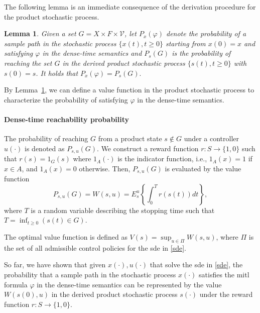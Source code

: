 \documentclass[letterpaper, 10 pt, conference]{ieeeconf}
\newtheorem{lemma}{Lemma}
\newcommand{\calV}{\mathcal{V}}
\begin{document}
The following lemma is an immediate consequence of the derivation
procedure for the product stochastic process.
\begin{lemma}
\label{lma:relate}
  Given a set $G= X\times F\times \calV$, let $P_{x}(\varphi )$ denote
  the probability of a sample path in the stochastic process
  $\{x(t),t\ge 0\}$ starting from $ x (0)=x$ and satisfying $\varphi$
  in the dense-time semantics and $P_{s}( G)$ is the probability of
  reaching the set $G$ in the derived product stochastic process
  $\{s(t), t\ge0 \}$ with $s(0)=s$. It holds that
  $P_{x}(\varphi )= P_{s}( G). $
\end{lemma}
By Lemma~\ref{lma:relate}, we can define a value function in the product
stochastic process to characterize the probability of satisfying
$\varphi$ in the dense-time semantics.
\paragraph*{\bf Dense-time reachability probability}
The probability of
reaching $G$ from a product state $s \notin G$ under a controller
$u(\cdot)$ is denoted as $P_{s, u}( G)$.
We construct a reward function $r: S \rightarrow \{1,0\}$ such
that $r(s)=1_G(s)$ where $1_A(\cdot)$ is the indicator function, i.e.,
$1_A(x)=1$ if $x\in A$, and $1_A(x)=0$ otherwise.
Then, $P_{s,u}( G)$ is evaluated by the value function
\[
P_{s,u}( G) = W(s, u)= E^u_{s}\left\{ \int_0^T r(s(t) )dt \right\},
\]
where $T$ is a random variable describing the stopping time such that
$T= \inf_{t\ge 0}(s(t) \in G)$.  





The optimal value function is defined as
$ V (s) = \sup_{u \in \Pi} W(s,u)$, where $\Pi$ is the set of all
admissible control policies for the \ac{sde} in \eqref{sde}.


So far, we have shown that given $x(\cdot), u(\cdot)$ that solve the
\ac{sde} in \eqref{sde}, the probability that a sample path in the
stochastic process $x(\cdot)$ satisfies the \ac{mitl} formula
$\varphi$ in the dense-time semantics can be represented by the value
$W(s(0),u)$ in the derived product stochastic process $s(\cdot)$ under
the reward function $r:S\rightarrow
\{1,0\}$.
\end{document}
